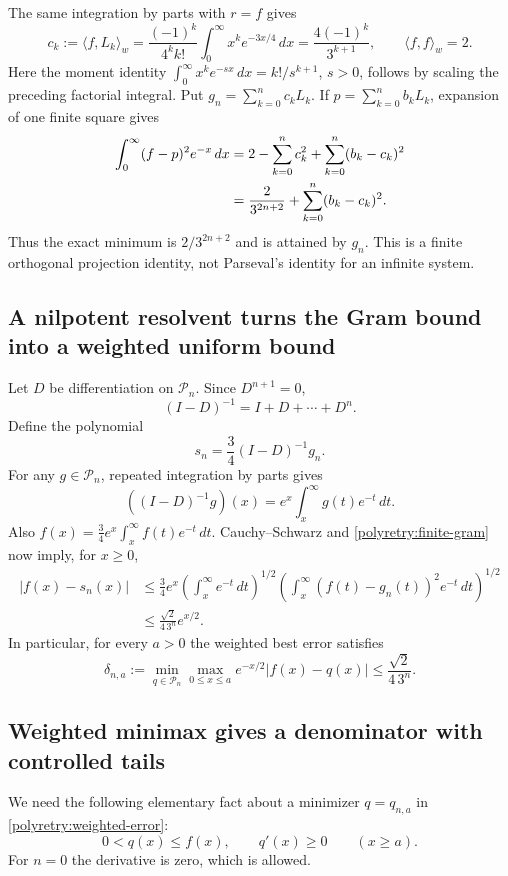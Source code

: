 \documentclass[11pt]{article}
\theoremstyle{remark}
\numberwithin{equation}{section}
\begin{document}
The same integration by parts with $r=f$ gives
\[
 c_k:=\langle f,L_k\rangle_w
 =\frac{(-1)^k}{4^kk!}
   \int_0^\infty x^ke^{-3x/4}\,dx
 =\frac{4(-1)^k}{3^{k+1}},\qquad \langle f,f\rangle_w=2.
\]
Here the moment identity
$\int_0^\infty x^ke^{-s x}\,dx=k!/s^{k+1}$, $s>0$,
follows by scaling the preceding factorial integral.
Put $g_n=\sum_{k=0}^nc_kL_k$.  If
$p=\sum_{k=0}^nb_kL_k$, expansion of one finite square gives
\begin{align}
 \int_0^\infty(f-p)^2e^{-x}\,dx
 &=2-\sum_{k=0}^nc_k^2+\sum_{k=0}^n(b_k-c_k)^2 \notag\\
 &=\frac{2}{3^{2n+2}}+\sum_{k=0}^n(b_k-c_k)^2.
 \label{polyretry:finite-gram}
\end{align}
Thus the exact minimum is $2/3^{2n+2}$ and is attained by $g_n$.
This is a finite orthogonal projection identity, not Parseval's
identity for an infinite system.

\subsection{A nilpotent resolvent turns the Gram bound into a weighted uniform bound}
Let $D$ be differentiation on $\mathcal P_n$.  Since $D^{n+1}=0$,
\[
 (I-D)^{-1}=I+D+\cdots+D^n.
\]
Define the polynomial
\[
 s_n=\frac34(I-D)^{-1}g_n.
\]
For any $g\in\mathcal P_n$, repeated integration by parts gives
\[
 ((I-D)^{-1}g)(x)=e^x\int_x^\infty g(t)e^{-t}\,dt.
\]
Also $f(x)=\frac34e^x\int_x^\infty f(t)e^{-t}\,dt$.
Cauchy--Schwarz and \eqref{polyretry:finite-gram} now imply, for $x\ge0$,
\begin{align*}
 |f(x)-s_n(x)|
 &\le\frac34e^x
   \left(\int_x^\infty e^{-t}\,dt\right)^{1/2}
   \left(\int_x^\infty(f(t)-g_n(t))^2e^{-t}\,dt\right)^{1/2}\\
 &\le\frac{\sqrt2}{4\,3^n}e^{x/2}.
\end{align*}
In particular, for every $a>0$ the weighted best error satisfies
\begin{equation}\label{polyretry:weighted-error}
 \delta_{n,a}:=\min_{q\in\mathcal P_n}
    \max_{0\le x\le a} e^{-x/2}|f(x)-q(x)|
 \le\frac{\sqrt2}{4\,3^n}.
\end{equation}

\subsection{Weighted minimax gives a denominator with controlled tails}
We need the following elementary fact about a minimizer $q=q_{n,a}$
in \eqref{polyretry:weighted-error}:
\begin{equation}\label{polyretry:minimax-tail}
 0<q(x)\le f(x),\qquad q'(x)\ge0\qquad(x\ge a).
\end{equation}
For $n=0$ the derivative is zero, which is allowed.
\end{document}
